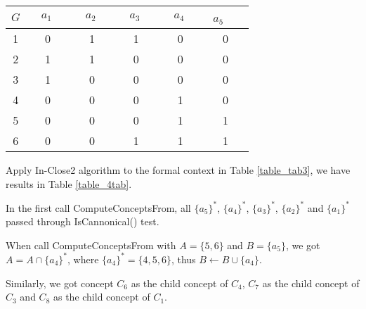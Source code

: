 \documentclass[11pt]{article}
\numberwithin{equation}{subsection}
\begin{document}
 \begin{table*}[ht]
            \begin{center}
                \begin{normalsize}
                    \caption{Formal context  }
                    \label{table_tab3}
                    \begin{tabular}
                        {|c|c c  c  c  c|}
                        \hline
                        $G$     & $\ \ \ \ a_1\ \ \ \ \ $       &  $\ \ \ \ a_2\ \ \ \ \ $  &  $\ \ \ \ a_3\ \ \ \ \ $  & $\ \ \ \ a_4\ \ \ \ \ $  &  $\ \ a_5$\ \ \  \\
                       \hline
 1 & 0   & 1  &  1  & 0 &  0  \\

 2 & 1  &  1  & 0 &  0  &  0   \\

 3 & 1   & 0 &  0  &  0  &  0   \\

4 & 0 &  0  &  0  &  1  &  0  \\

5 & 0 &  0  &  0  &  1 &   1  \\

6 & 0 &  0  &  1  &  1 &   1  \\
\hline
                    \end{tabular}
                \end{normalsize}
            \end{center}
        \end{table*}

Apply In-Close2 algorithm to the formal context in Table \ref{table_tab3}, we have results in Table \ref{table_4tab}.

In the first call ComputeConceptsFrom, all $\{a_5\}^*$, $\{a_4\}^*$, $\{a_3\}^*$, $\{a_2\}^*$ and $\{a_1\}^*$   passed through IsCannonical() test.

When call ComputeConceptsFrom with  $A=\{5,6\}$ and $B=\{a_5\}$,   we got $A=A\cap\{a_4\}^*$, where $\{a_4\}^*=\{4,5,6\}$,
 thus $B\leftarrow B\cup \{a_4\}$.

Similarly, we got concept $C_6$ as the child concept of $C_4$,  $C_7$ as the child concept of $C_3$ and $C_8$ as the child concept of $C_1$.
\end{document}
